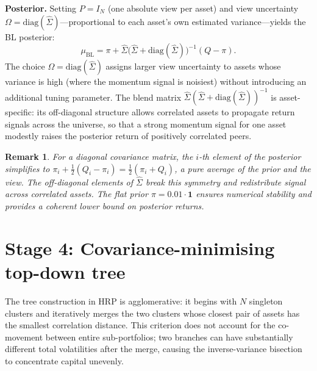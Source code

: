 \documentclass[a4paper,12pt]{report}
\newtheorem{remark}{Remark}
\newcommand{\muBL}{\mu_{\mathrm{BL}}}
\newcommand{\diag}{\mathrm{diag}}
\begin{document}
\textbf{Posterior.} Setting $P = I_N$ (one absolute view per asset) and
view uncertainty $\Omega = \diag(\hat{\Sigma})$---proportional to each
asset's own estimated variance---yields the BL posterior:
\begin{equation}
  \muBL = \pi + \hat{\Sigma}\bigl(\hat{\Sigma} +
          \diag(\hat{\Sigma})\bigr)^{-1}(Q - \pi).
  \label{eq:bl-posterior}
\end{equation}
The choice $\Omega = \diag(\hat{\Sigma})$ assigns larger view uncertainty
to assets whose variance is high (where the momentum signal is noisiest)
without introducing an additional tuning parameter. The blend matrix
$\hat{\Sigma}(\hat{\Sigma}+\diag(\hat{\Sigma}))^{-1}$ is asset-specific:
its off-diagonal structure allows correlated assets to propagate return
signals across the universe, so that a strong momentum signal for one asset
modestly raises the posterior return of positively correlated peers.

\begin{remark}
For a diagonal covariance matrix, the $i$-th element of the posterior
simplifies to $\pi_i + \frac{1}{2}(Q_i - \pi_i) = \frac{1}{2}(\pi_i + Q_i)$,
a pure average of the prior and the view. The off-diagonal elements of
$\hat{\Sigma}$ break this symmetry and redistribute signal across correlated
assets. The flat prior $\pi = 0.01 \cdot \mathbf{1}$ ensures numerical
stability and provides a coherent lower bound on posterior returns.
\end{remark}

\section{Stage 4: Covariance-minimising top-down tree}
\label{sec:meth-tree}

The tree construction in HRP is agglomerative: it begins with $N$ singleton
clusters and iteratively merges the two clusters whose closest pair of assets
has the smallest correlation distance. This criterion does not account for
the co-movement between entire sub-portfolios; two branches can have
substantially different total volatilities after the merge, causing the
inverse-variance bisection to concentrate capital unevenly.
\end{document}
